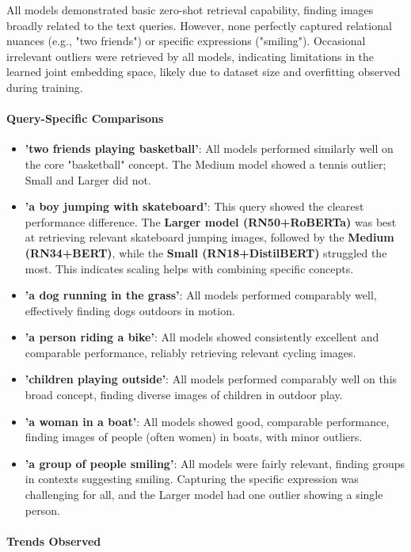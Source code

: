 \documentclass{article}
\begin{document}
All models demonstrated basic zero-shot retrieval capability, finding images broadly related to the text queries. However, none perfectly captured relational nuances (e.g., "two friends") or specific expressions ("smiling"). Occasional irrelevant outliers were retrieved by all models, indicating limitations in the learned joint embedding space, likely due to dataset size and overfitting observed during training.

\paragraph{Query-Specific Comparisons}

\begin{itemize}
    \item \textbf{'two friends playing basketball'}: All models performed similarly well on the core "basketball" concept. The Medium model showed a tennis outlier; Small and Larger did not.
    \item \textbf{'a boy jumping with skateboard'}: This query showed the clearest performance difference. The \textbf{Larger model (RN50+RoBERTa)} was best at retrieving relevant skateboard jumping images, followed by the \textbf{Medium (RN34+BERT)}, while the \textbf{Small (RN18+DistilBERT)} struggled the most. This indicates scaling helps with combining specific concepts.
    \item \textbf{'a dog running in the grass'}: All models performed comparably well, effectively finding dogs outdoors in motion.
    \item \textbf{'a person riding a bike'}: All models showed consistently excellent and comparable performance, reliably retrieving relevant cycling images.
    \item \textbf{'children playing outside'}: All models performed comparably well on this broad concept, finding diverse images of children in outdoor play.
    \item \textbf{'a woman in a boat'}: All models showed good, comparable performance, finding images of people (often women) in boats, with minor outliers.
    \item \textbf{'a group of people smiling'}: All models were fairly relevant, finding groups in contexts suggesting smiling. Capturing the specific expression was challenging for all, and the Larger model had one outlier showing a single person.
\end{itemize}

\paragraph{Trends Observed}
\end{document}
